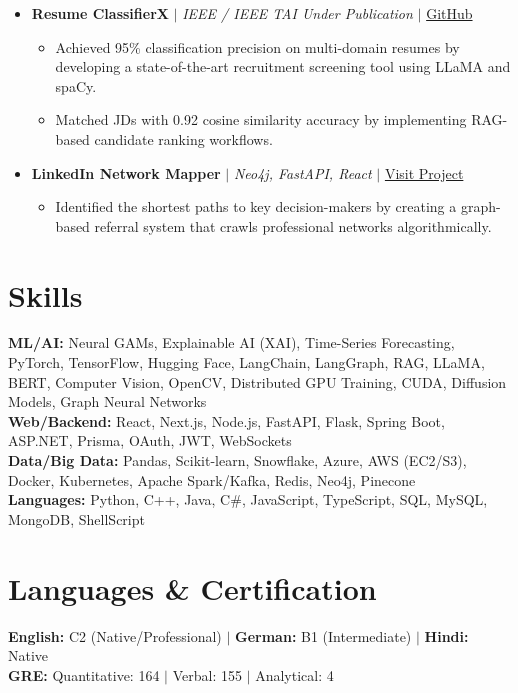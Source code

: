 \documentclass[10pt,a4paper]{article}
\newcommand{\resumeItem}[1]{\item\small{#1}}
\begin{document}
\begin{itemize}[label={}]
    \item \textbf{Resume ClassifierX} $|$ \emph{IEEE / IEEE TAI Under Publication} $|$ \href{https://github.com/KartavyaDikshit/ResumeClassifierX}{GitHub}
    \begin{itemize}
        \resumeItem{Achieved 95\% classification precision on multi-domain resumes by developing a state-of-the-art recruitment screening tool using LLaMA and spaCy.}
        \resumeItem{Matched JDs with 0.92 cosine similarity accuracy by implementing RAG-based candidate ranking workflows.}
    \end{itemize}

    \item \textbf{LinkedIn Network Mapper} $|$ \emph{Neo4j, FastAPI, React} $|$ \href{https://kartavyadikshit.github.io/NetworkMapper}{Visit Project}
    \begin{itemize}
        \resumeItem{Identified the shortest paths to key decision-makers by creating a graph-based referral system that crawls professional networks algorithmically.}
    \end{itemize}
\end{itemize}

\section{Skills}
\begin{itemize}[label={}]
    \small{\item{
     \textbf{ML/AI:}{ Neural GAMs, Explainable AI (XAI), Time-Series Forecasting, PyTorch, TensorFlow, Hugging Face, LangChain, LangGraph, RAG, LLaMA, BERT, Computer Vision, OpenCV, Distributed GPU Training, CUDA, Diffusion Models, Graph Neural Networks} \\
     \textbf{Web/Backend:}{ React, Next.js, Node.js, FastAPI, Flask, Spring Boot, ASP.NET, Prisma, OAuth, JWT, WebSockets} \\
     \textbf{Data/Big Data:}{ Pandas, Scikit-learn, Snowflake, Azure, AWS (EC2/S3), Docker, Kubernetes, Apache Spark/Kafka, Redis, Neo4j, Pinecone} \\
     \textbf{Languages:}{ Python, C++, Java, C\#, JavaScript, TypeScript, SQL, MySQL, MongoDB, ShellScript}
    }}
\end{itemize}

\section{Languages \& Certification}
\begin{itemize}[label={}]
    \small{\item{
     \textbf{English:}{ C2 (Native/Professional)} $|$ \textbf{German:}{ B1 (Intermediate)} $|$ \textbf{Hindi:}{ Native} \\
     \textbf{GRE:}{ Quantitative: 164 $|$ Verbal: 155 $|$ Analytical: 4}
    }}
\end{itemize}
\end{document}
